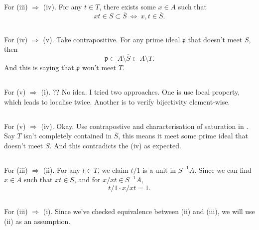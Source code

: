 \subsection{}\label{Atiyah Chapter 3 Ex 8. 3-4}

For (iii) $\Rightarrow$ (iv). For any $t\in T$, there exists some $x\in A$ such that 
\[xt\in S\subset \overline{S} ~\Leftrightarrow~ x,t\in\overline{S}.\]

\subsection{}

For (iv) $\Rightarrow$ (v). Take contrapositive. For any prime ideal $\mathfrak p$ that doesn't meet $S$, then \[\mathfrak p\subset A\setminus \overline{S}\subset A\setminus T.\] And this is saying that $\mathfrak p$ won't meet $T$.

\subsection{}

For (v) $\Rightarrow$ (i). 
?? No idea. I tried two approaches. One is use local property, which leads to localise twice. Another is to verify bijectivity element-wise.

\subsection{}

For (v) $\Rightarrow$ (iv). Okay. Use contrapostive and characterisation of saturation in . Say $T$ isn't completely contained in $\overline{S}$, this means it meet some prime ideal that doesn't meet $S$. And this contradicts the (iv) as expected.

\subsection{}

For (iii) $\Rightarrow$ (ii). For any $t\in T$, we claim $t/1$ is a unit in $S^{-1}A$. Since we can find $x\in A$ such that $xt\in S$, and for $x/xt\in S^{-1}A$,
\[t/1\cdot x/xt = 1.\]

\subsection{}

For (iii) $\Rightarrow$ (i). Since we've checked equivalence between (ii) and (iii), we will use (ii) as an assumption.

